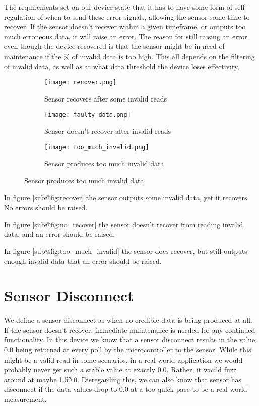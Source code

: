 The requirements set on our device state that it has to have some form of self-regulation of when to send these error signals, allowing the sensor some time to recover. If the sensor doesn't recover within a given timeframe, or outputs too much erroneous data, it will raise an error. The reason for still raising an error even though the device recovered is that the sensor might be in need of maintenance if the \% of invalid data is too high. This all depends on the filtering of invalid data, as well as at what data threshold the device loses effectivity.

\begin{figure}[H]
\centering
	\begin{subfigure}[b]{0.3\textwidth}
    \texttt{[image: recover.png]}
    \caption{Sensor recovers after some invalid reads}
    \label{fig:recover}
	\end{subfigure}
	\begin{subfigure}[b]{0.3\textwidth}
    \texttt{[image: faulty\_data.png]}
    \caption{Sensor doesn't recover after invalid reads}
    \label{fig:no_recover}
	\end{subfigure}
	\begin{subfigure}[b]{0.3\textwidth}
    \texttt{[image: too\_much\_invalid.png]}
    \caption{Sensor produces too much invalid data}
    \label{fig:too_much_invalid}
	\end{subfigure}
\end{figure}
In figure \ref{sub@fig:recover} the sensor outputs some invalid data, yet it recovers. No errors should be raised.

In figure \ref{sub@fig:no_recover} the sensor doesn't recover from reading invalid data, and an error should be raised.

In figure \ref{sub@fig:too_much_invalid} the sensor does recover, but still outputs enough invalid data that an error should be raised. 


\section{Sensor Disconnect}
We define a sensor disconnect as when no credible data is being produced at all. If the sensor doesn't recover, immediate maintenance is needed for any continued functionality. In this device we know that a sensor disconnect results in the value 0.0 being returned at every poll by the microcontroller to the sensor. While this might be a valid read in some scenarios, in a real world application we would probably never get such a stable value at exactly 0.0. Rather, it would fuzz around at maybe 1.5\~0.0. Disregarding this, we can also know that sensor has disconnect if the data values drop to 0.0 at a too quick pace to be a real-world measurement. 

